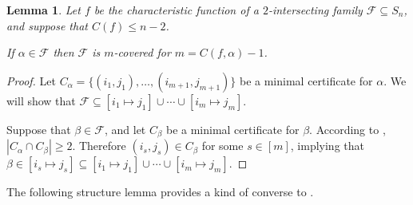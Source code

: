 \documentclass{article}
\newtheorem{lemma}[theorem]{Lemma}
\theoremstyle{definition}
\providecommand{\coset}[2]{[#1 \mapsto #2]}
\begin{document}
\begin{lemma} \label{lem:covering-sym}
Let $f$ be the characteristic function of a $2$-intersecting family $\mathcal{F} \subseteq S_n$, and suppose that $C(f) \leq n-2$.

If $\alpha \in \mathcal{F}$ then $\mathcal{F}$ is $m$-covered for $m = C(f,\alpha) - 1$.
\end{lemma}
\begin{proof}
Let $C_\alpha = \{(i_1,j_1),\ldots,(i_{m+1},j_{m+1})\}$ be a minimal certificate for $\alpha$. We will show that $\mathcal{F} \subseteq \coset{i_1}{j_1} \cup \cdots \cup \coset{i_m}{j_m}$.

Suppose that $\beta \in \mathcal{F}$, and let $C_\beta$ be a minimal certificate for $\beta$. According to , $|C_\alpha \cap C_\beta| \geq 2$. Therefore $(i_s,j_s) \in C_\beta$ for some $s \in [m]$, implying that $\beta \in \coset{i_s}{j_s} \subseteq \coset{i_1}{j_1} \cup \cdots \cup \coset{i_m}{j_m}$.
\end{proof}

The following structure lemma provides a kind of converse to .
\end{document}
